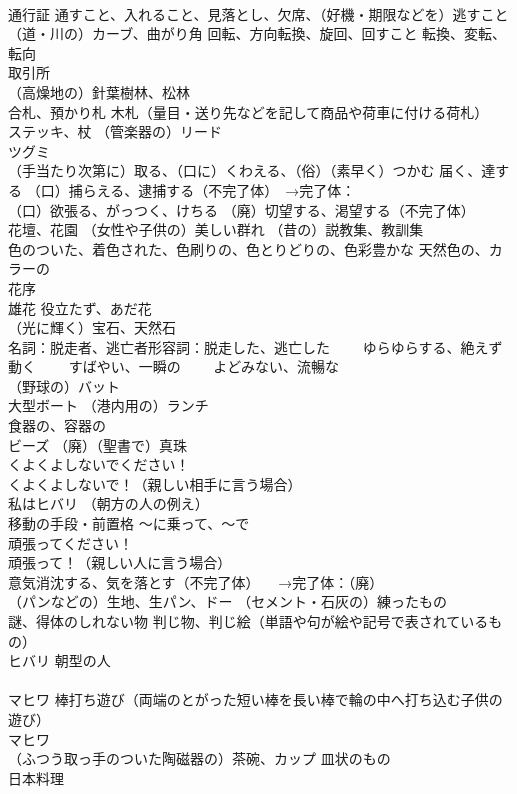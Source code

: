\documentclass[8pt]{extreport}
\begin{document}
\begin{CJK}{UTF8}{min}
\\	通行証 通すこと、入れること、見落とし、欠席、（好機・期限などを）逃すこと
\\	（道・川の）カーブ、曲がり角 回転、方向転換、旋回、回すこと 転換、変転、転向
\\	取引所
\\	（高燥地の）針葉樹林、松林
\\	合札、預かり札 木札（量目・送り先などを記して商品や荷車に付ける荷札）
\\	ステッキ、杖 （管楽器の）リード
\\	ツグミ
\\	（手当たり次第に）取る、（口に）くわえる、（俗）（素早く）つかむ 届く、達する （口）捕らえる、逮捕する（不完了体）　→完了体：
\\	（口）欲張る、がっつく、けちる （廃）切望する、渇望する（不完了体）
\\	花壇、花園 （女性や子供の）美しい群れ （昔の）説教集、教訓集
\\	色のついた、着色された、色刷りの、色とりどりの、色彩豊かな 天然色の、カラーの
\\	花序
\\	雄花 役立たず、あだ花
\\	（光に輝く）宝石、天然石
\\	名詞：脱走者、逃亡者形容詞：脱走した、逃亡した 　　ゆらゆらする、絶えず動く 　　すばやい、一瞬の 　　よどみない、流暢な
\\	（野球の）バット
\\	大型ボート （港内用の）ランチ
\\	食器の、容器の
\\	[集合]ビーズ （廃）（聖書で）真珠
\\	くよくよしないでください！
\\	くよくよしないで！（親しい相手に言う場合）
\\	私はヒバリ （朝方の人の例え）
\\	移動の手段・前置格	〜に乗って、〜で
\\	頑張ってください！
\\	頑張って！（親しい人に言う場合）
\\	意気消沈する、気を落とす（不完了体） 　→完了体：（廃）
\\	（パンなどの）生地、生パン、ドー （セメント・石灰の）練ったもの
\\	謎、得体のしれない物 判じ物、判じ絵（単語や句が絵や記号で表されているもの）
\\	ヒバリ 朝型の人
\\	[指小形・表愛形]
\\	マヒワ 棒打ち遊び（両端のとがった短い棒を長い棒で輪の中へ打ち込む子供の遊び）
\\	マヒワ
\\	（ふつう取っ手のついた陶磁器の）茶碗、カップ 皿状のもの
\\	日本料理
\end{CJK}
\end{document}
